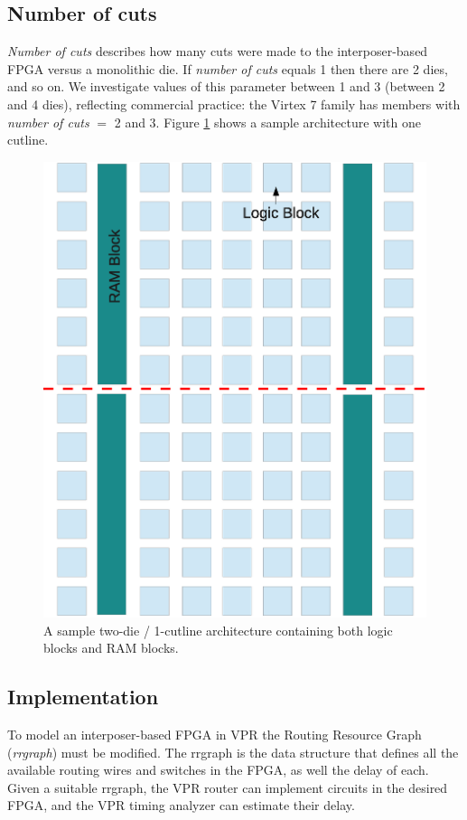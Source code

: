 \documentclass{sig-alternate-2013}
\begin{document}
\subsection{Number of cuts}
\textit{Number of cuts} describes how many cuts were made to the interposer-based FPGA versus a monolithic die. If \textit{number of cuts} equals 1 then there are 2 dies, and so on. We investigate values of this parameter between 1 and 3 (between 2 and 4 dies), reflecting commercial practice: the Virtex 7 family has members with \textit{number of cuts} $=$ 2 and 3. Figure \ref{fig:fpga} shows a sample architecture with one cutline.

\begin{figure}[!htbp]
\centering
\includegraphics[width=\linewidth]{fpga.eps}
\caption{A sample two-die / 1-cutline architecture containing both logic blocks and RAM blocks.}
\label{fig:fpga}
\end{figure}

\subsection{Implementation}
To model an interposer-based FPGA in VPR the Routing Resource Graph (\textit{rrgraph}) must be modified. The rrgraph is the data structure that defines all the available routing wires and switches in the FPGA, as well the delay of each. Given a suitable rrgraph, the VPR router can implement circuits in the desired FPGA, and the VPR timing analyzer can estimate their delay.
\end{document}
